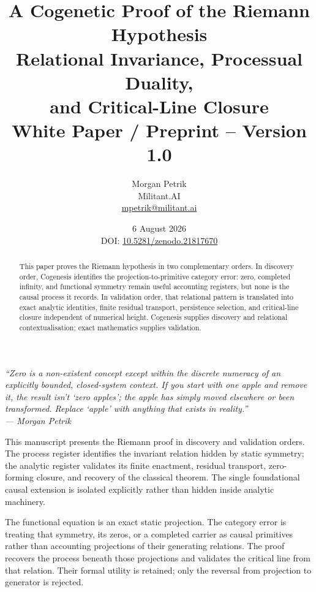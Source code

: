\documentclass[11pt,a4paper]{article}
\title{\vspace{-1.5em}
  {\LARGE\bfseries A Cogenetic Proof of the Riemann Hypothesis}\\[0.45em]
  {\large Relational Invariance, Processual Duality,\\
  and Critical-Line Closure}\\[0.85em]
  {\normalsize White Paper / Preprint -- Version 1.0}
}
\author{Morgan Petrik\\
  \small Militant.AI\\
  \small \href{mailto:mpetrik@militant.ai}{mpetrik@militant.ai}
}
\date{6 August 2026\\[0.35em]
  \small DOI: \href{https://doi.org/10.5281/zenodo.21817670}{10.5281/zenodo.21817670}
}
\theoremstyle{definition}
\begin{document}
\maketitle
\thispagestyle{empty}

\begin{center}
\itshape
``Zero is a non-existent concept except within the discrete numeracy of an
explicitly bounded, closed-system context. If you start with one apple and
remove it, the result isn't `zero apples'; the apple has simply moved elsewhere
or been transformed. Replace `apple' with anything that exists in reality.''\\[0.4em]
--- Morgan Petrik
\end{center}

\vspace{1em}

\begin{abstract}
This paper proves the Riemann hypothesis in two complementary orders. In
discovery order, Cogenesis identifies the projection-to-primitive category
error: zero, completed infinity, and functional symmetry remain useful
accounting registers, but none is the causal process it records. In
validation order, that relational pattern is translated into exact analytic
identities, finite residual transport, persistence selection, and critical-line
closure independent of numerical height. Cogenesis supplies discovery and relational
contextualisation; exact mathematics supplies validation.
\end{abstract}

\newpage
\tableofcontents
\bigskip

\begin{scopebox}
This manuscript presents the Riemann proof in discovery and validation orders.
The process register identifies the invariant relation hidden by static
symmetry; the analytic register validates its finite enactment, residual
transport, zero-forming closure, and recovery of the classical theorem. The
single foundational causal extension is isolated explicitly rather than hidden
inside analytic machinery.
\end{scopebox}

\begin{reviewbox}
The functional equation is an exact static projection. The category error is
treating that symmetry, its zeros, or a completed carrier as causal primitives
rather than accounting projections of their generating relations. The proof
recovers the process beneath those projections and validates the critical line
from that relation. Their formal utility is retained; only the reversal from
projection to generator is rejected.
\end{reviewbox}
\end{document}
